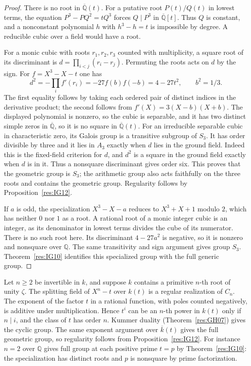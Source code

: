\begin{proof}
There is no root in \(\overline{\mathbb Q}(t)\).
For a putative root \(P(t)/Q(t)\) in lowest terms, the equation
\(P^3-PQ^2=tQ^3\) forces \(Q\mid P^3\) in
\(\overline{\mathbb Q}[t]\). Thus \(Q\) is constant, and
a nonconstant polynomial \(h\) with \(h^3-h=t\) is impossible
by degree. A reducible cubic over a field would have a root.

For a monic cubic with roots \(r_1,r_2,r_3\) counted with multiplicity,
a square root of its discriminant is
\(d=\prod_{i<j}(r_i-r_j)\). Permuting the roots acts on \(d\)
by the sign. For \(f=X^3-X-t\) one has
\[
 d^2=-\prod_i f'(r_i)
     =-27f(b)f(-b)=4-27t^2,\qquad b^2=1/3 .
\]
The first equality follows by taking each ordered pair of
distinct indices in the derivative product; the second follows
from \(f'(X)=3(X-b)(X+b)\). The displayed polynomial is
nonzero, so the cubic is separable, and it has two distinct
simple zeros in \(\overline{\mathbb Q}\), so it is no square
in \(\overline{\mathbb Q}(t)\). For an irreducible separable
cubic in characteristic zero, its Galois group is a transitive
subgroup of \(S_3\). It has order divisible by three and it
lies in \(A_3\) exactly when \(d\) lies in the ground field.
Indeed this is the fixed-field criterion for \(d\), and
\(d^2\) is a square in the ground field exactly when \(d\) is
in it. Thus a nonsquare discriminant gives order six.
This proves that the geometric group is \(S_3\); the arithmetic
group also acts faithfully on the three roots and contains the
geometric group. Regularity follows by Proposition~\ref{res:IG12}.

If \(a\) is odd, the specialization \(X^3-X-a\) reduces to
\(X^3+X+1\) modulo \(2\), which has neither \(0\) nor \(1\)
as a root. A rational root of a monic integer cubic is an
integer, as its denominator in lowest terms divides the cube
of its numerator. There is no such root here. Its discriminant
\(4-27a^2\) is negative, so it is nonzero and nonsquare over
\(\mathbb Q\). The same transitivity and sign argument gives
group \(S_3\). Theorem~\ref{res:IG10} identifies this specialized
group with the full generic group.
\end{proof}

\begin{example}
\label{res:IG14}
Let \(n\geq2\) be invertible in \(k\), and suppose \(k\) contains a
primitive \(n\)-th root of unity \(\zeta\). The
splitting field of \(X^n-t\) over \(k(t)\) is a regular realization
of \(C_n\). The exponent of the factor \(t\) in a rational
function, with poles counted negatively, is additive under
multiplication. Hence \(t^i\) can be an \(n\)-th power in \(k(t)\)
only if \(n\mid i\), and the class of \(t\) has order \(n\).
Kummer duality (Theorem~\ref{res:GH07}) gives the cyclic group.
The same exponent argument over \(\overline k(t)\) gives the
full geometric group, so regularity follows from
Proposition~\ref{res:IG12}. For instance \(n=2\) over
\(\mathbb Q\) gives full group at each positive prime \(t=p\)
by Theorem~\ref{res:IG10}: the specialization has distinct roots
and \(p\) is nonsquare by prime factorization.
\end{example}

